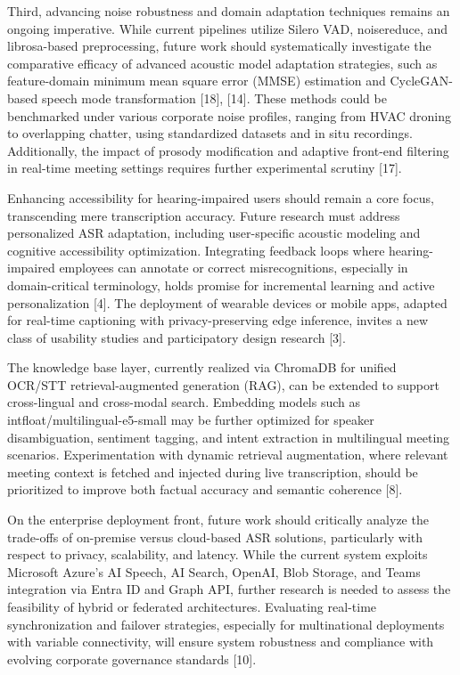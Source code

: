\documentclass[12pt,a4paper]{article}
\begin{document}
Third, advancing noise robustness and domain adaptation techniques remains an ongoing imperative. While current pipelines utilize Silero VAD, noisereduce, and librosa-based preprocessing, future work should systematically investigate the comparative efficacy of advanced acoustic model adaptation strategies, such as feature-domain minimum mean square error (MMSE) estimation and CycleGAN-based speech mode transformation [18], [14]. These methods could be benchmarked under various corporate noise profiles, ranging from HVAC droning to overlapping chatter, using standardized datasets and in situ recordings. Additionally, the impact of prosody modification and adaptive front-end filtering in real-time meeting settings requires further experimental scrutiny [17].


Enhancing accessibility for hearing-impaired users should remain a core focus, transcending mere transcription accuracy. Future research must address personalized ASR adaptation, including user-specific acoustic modeling and cognitive accessibility optimization. Integrating feedback loops where hearing-impaired employees can annotate or correct misrecognitions, especially in domain-critical terminology, holds promise for incremental learning and active personalization [4]. The deployment of wearable devices or mobile apps, adapted for real-time captioning with privacy-preserving edge inference, invites a new class of usability studies and participatory design research [3].


The knowledge base layer, currently realized via ChromaDB for unified OCR/STT retrieval-augmented generation (RAG), can be extended to support cross-lingual and cross-modal search. Embedding models such as intfloat/multilingual-e5-small may be further optimized for speaker disambiguation, sentiment tagging, and intent extraction in multilingual meeting scenarios. Experimentation with dynamic retrieval augmentation, where relevant meeting context is fetched and injected during live transcription, should be prioritized to improve both factual accuracy and semantic coherence [8].


On the enterprise deployment front, future work should critically analyze the trade-offs of on-premise versus cloud-based ASR solutions, particularly with respect to privacy, scalability, and latency. While the current system exploits Microsoft Azure’s AI Speech, AI Search, OpenAI, Blob Storage, and Teams integration via Entra ID and Graph API, further research is needed to assess the feasibility of hybrid or federated architectures. Evaluating real-time synchronization and failover strategies, especially for multinational deployments with variable connectivity, will ensure system robustness and compliance with evolving corporate governance standards [10].
\end{document}

